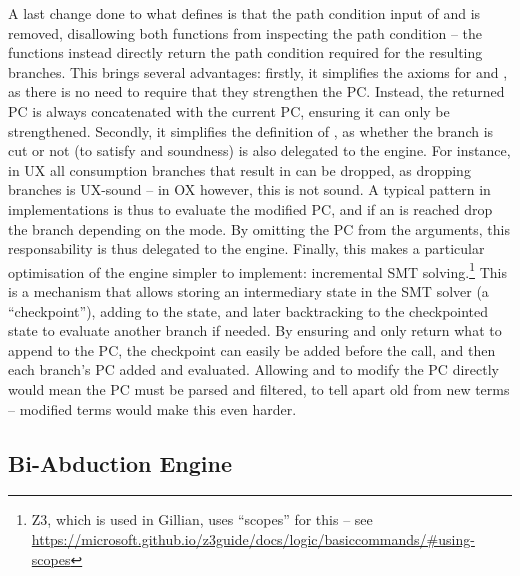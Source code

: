A last change done to what \cite{cse2} defines is that the path condition input of  \consume{} and \produce{} is removed, disallowing both functions from inspecting the path condition -- the functions instead directly return the path condition required for the resulting branches. This brings several advantages: firstly, it simplifies the axioms for \consume{} and \produce{}, as there is no need to require that they strengthen the PC. Instead, the returned PC is always concatenated with the current PC, ensuring it can only be strengthened. Secondly, it simplifies the definition of \consume{}, as whether the branch is cut or not (to satisfy \OX{} and \UX{} soundness) is also delegated to the engine. For instance, in UX all consumption branches that result in \LFail{} can be dropped, as dropping branches is UX-sound -- in OX however, this is not sound. A typical pattern in \consume{} implementations is thus to evaluate the modified PC, and if an \LFail{} is reached drop the branch depending on the mode. By omitting the PC from the arguments, this responsability is thus delegated to the engine. Finally, this makes a particular optimisation of the engine simpler to implement: incremental SMT solving.\footnote{Z3, which is used in Gillian, uses ``scopes'' for this -- see \url{https://microsoft.github.io/z3guide/docs/logic/basiccommands/\#using-scopes}} This is a mechanism that allows storing an intermediary state in the SMT solver (a ``checkpoint''), adding to the state, and later backtracking to the checkpointed state to evaluate another branch if needed. By ensuring \consume{} and \produce{} only return what to append to the PC, the checkpoint can easily be added before the call, and then each branch's PC added and evaluated. Allowing \consume{} and \produce{} to modify the PC directly would mean the PC must be parsed and filtered, to tell apart old from new terms -- modified terms would make this even harder.

\subsection{Bi-Abduction Engine}

